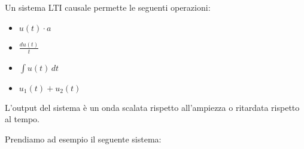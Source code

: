 \documentclass[a4paper]{article}
\begin{document}
\vspace{1em}
\noindent
Un sistema LTI causale permette le seguenti operazioni:
\begin{itemize}
  \item \( u(t) \cdot a \) 
  \item \( \frac{d u(t)}{t} \) 
  \item \( \int u(t) \,dt \) 
  \item \( u_1(t) + u_2(t) \) 
\end{itemize}
L'output del sistema è un onda scalata rispetto all'ampiezza o ritardata rispetto al
tempo.
\begin{example}
  \label{ex:lti-sin}
  Prendiamo ad esempio il seguente sistema:
  \begin{figure}[H]
    \centering
\end{figure}
\end{example}
\end{document}
